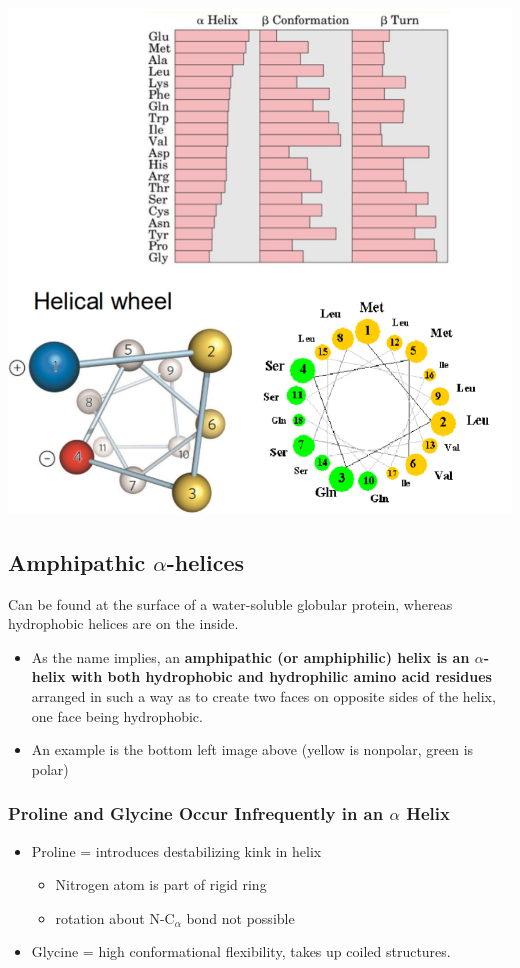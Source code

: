 \documentclass[10pt]{article}
\begin{document}
\begin{center}
    \includegraphics*[scale=0.7]{L2_5.png}
\end{center}
\subsection*{Amphipathic $\alpha$-helices}
Can be found at the surface of a water-soluble globular protein, whereas hydrophobic helices are on the inside.
\begin{itemize}
    \item As the name implies, an \textbf{amphipathic (or amphiphilic) helix is an $\alpha$-helix with both hydrophobic and hydrophilic amino acid residues} arranged in such a way as to create two faces on opposite sides of the helix, one face being hydrophobic.
    \item An example is the bottom left image above (yellow is nonpolar, green is polar)
\end{itemize}
\subsubsection*{Proline and Glycine Occur Infrequently in an $\alpha$ Helix}
\begin{itemize}
    \item Proline = introduces destabilizing kink in helix
    \begin{itemize}
        \item Nitrogen atom is part of rigid ring
        \item rotation about N-C$_\alpha$ bond not possible
    \end{itemize}
    \item Glycine = high conformational flexibility, takes up coiled structures.
\end{itemize}
\end{document}
